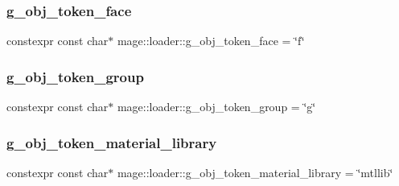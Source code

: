 \hypertarget{namespacemage_1_1loader_a41d912ea1f8cf2075751053dc33fdca4}{}\label{namespacemage_1_1loader_a41d912ea1f8cf2075751053dc33fdca4} 
\subsubsection{\texorpdfstring{g\+\_\+obj\+\_\+token\+\_\+face}{g\_obj\_token\_face}}
{\footnotesize\ttfamily constexpr const char$\ast$ mage\+::loader\+::g\+\_\+obj\+\_\+token\+\_\+face = \char`\"{}f\char`\"{}}

\hypertarget{namespacemage_1_1loader_a4f19cb1b9eac11c37b2421d6e781dfb2}{}\label{namespacemage_1_1loader_a4f19cb1b9eac11c37b2421d6e781dfb2} 
\subsubsection{\texorpdfstring{g\+\_\+obj\+\_\+token\+\_\+group}{g\_obj\_token\_group}}
{\footnotesize\ttfamily constexpr const char$\ast$ mage\+::loader\+::g\+\_\+obj\+\_\+token\+\_\+group = \char`\"{}g\char`\"{}}

\hypertarget{namespacemage_1_1loader_a2f808e4e1b0e354bbdb6fbfc2a86f900}{}\label{namespacemage_1_1loader_a2f808e4e1b0e354bbdb6fbfc2a86f900} 
\subsubsection{\texorpdfstring{g\+\_\+obj\+\_\+token\+\_\+material\+\_\+library}{g\_obj\_token\_material\_library}}
{\footnotesize\ttfamily constexpr const char$\ast$ mage\+::loader\+::g\+\_\+obj\+\_\+token\+\_\+material\+\_\+library = \char`\"{}mtllib\char`\"{}}

\hypertarget{namespacemage_1_1loader_a76bc69e4e7fe64cf538dc26c7e3ee173}{}\label{namespacemage_1_1loader_a76bc69e4e7fe64cf538dc26c7e3ee173} 

